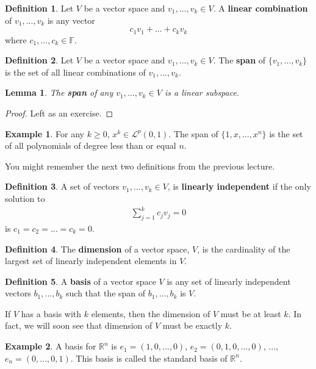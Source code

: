 \documentclass[12pt,reqno]{amsart}
\def\F{\mathbb{F}}
\def\R{\mathbb{R}}
\newtheorem{lemma}{Lemma}[section]
\theoremstyle{definition}
\newtheorem{definition}{Definition}[section]
\newtheorem{example}{Example}[section]
\begin{document}
\begin{definition}
  Let $V$ be a vector space and $v_1,..., v_k \in V$. A \textbf{linear
    combination} of $v_1,..., v_k$ is any vector 
  \[c_1 v_1 + ... + c_k v_k \]
  where $c_1, ..., c_k \in \F$. 
\end{definition}

\begin{definition}
  Let $V$ be a vector space and $v_1,..., v_k \in V$. The
  \textbf{span} of $\{ v_1, ... , v_k \}$ is the set
  of all linear combinations of $v_1, ... , v_k$.
\end{definition}
\begin{lemma}
  The \textbf{span} of any  $v_1,..., v_k \in V$ is a linear subspace.
\end{lemma}
\begin{proof}
  Left as an exercise.
\end{proof}

\begin{example}
  For any $k\geq 0$, $x^k \in \mathcal{L}^p(0,1)$. The span of $\{1,
  x, ..., x^n\}$ is the set of all polynomials of degree less than or
  equal $n$. 
\end{example}

You might remember the next two definitions from the previous lecture.
\begin{definition}
  A set of vectors $v_1, ..., v_k \in V$, is \textbf{linearly
    independent} if the only solution to
  \begin{align*}
    \sum_{j=1}^k c_j v_j = 0 
  \end{align*}
  is $c_1 = c_2 = ... = c_k = 0$. 
\end{definition}

\begin{definition}
  The \textbf{dimension} of a vector space, $V$, is the cardinality of
  the largest set of linearly independent elements in $V$.
\end{definition} 

\begin{definition}
  A \textbf{basis} of a vector space $V$ is any set of linearly
  independent vectors $b_1, ..., b_k$ such that the span of $b_1, ...,
  b_k$ is $V$.
\end{definition}
If $V$ has a basis with $k$ elements, then the dimension of $V$ must
be at least $k$. In fact, we will soon see that dimension of $V$ must
be exactly $k$.
\begin{example}
  A basis for $\R^n$ is $e_1 = (1, 0, ..., 0 )$, $e_2 = (0, 1, 0, ...,
  0)$, $...$, $e_n = (0, ... , 0 , 1)$. This basis is called the
  standard basis of $\R^n$. 
\end{example}
\end{document}

